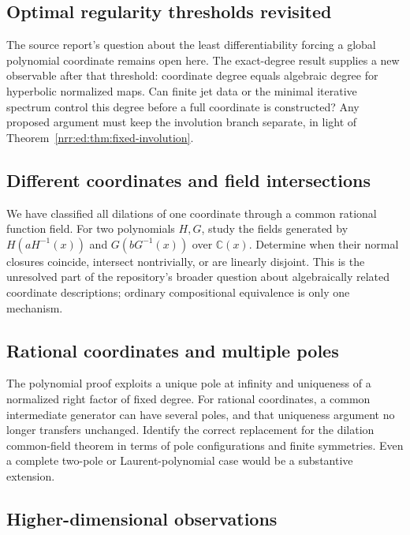 \documentclass[11pt,letterpaper]{article}
\theoremstyle{definition}
\theoremstyle{remark}
\newcommand{\C}{\mathbb C}
\begin{document}
\subsection{Optimal regularity thresholds revisited}

The source report's question about the least differentiability forcing a global
polynomial coordinate remains open here. The exact-degree result supplies a new
observable after that threshold: coordinate degree equals algebraic degree for
hyperbolic normalized maps. Can finite jet data or the minimal iterative spectrum
control this degree before a full coordinate is constructed? Any proposed argument
must keep the involution branch separate, in light of Theorem~\ref{nrr:ed:thm:fixed-involution}.

\subsection{Different coordinates and field intersections}
\label{nrr:ed:q-coordinates}

We have classified all dilations of one coordinate through a common rational
function field. For two polynomials $H,G$, study the fields generated by
$H(aH^{-1}(x))$ and $G(bG^{-1}(x))$ over $\C(x)$. Determine when their normal
closures coincide, intersect nontrivially, or are linearly disjoint. This is the
unresolved part of the repository's broader question about algebraically related
coordinate descriptions; ordinary compositional equivalence is only one mechanism.

\subsection{Rational coordinates and multiple poles}

The polynomial proof exploits a unique pole at infinity and uniqueness of a
normalized right factor of fixed degree. For rational coordinates, a common
intermediate generator can have several poles, and that uniqueness argument no
longer transfers unchanged. Identify the correct replacement for the dilation
common-field theorem in terms of pole configurations and finite symmetries.
Even a complete two-pole or Laurent-polynomial case would be a substantive extension.

\subsection{Higher-dimensional observations}
\end{document}
